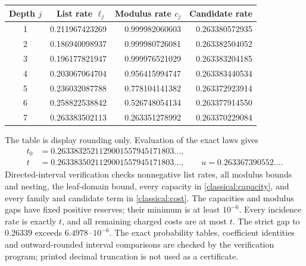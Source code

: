 \documentclass[10pt,a4paper]{article}
\theoremstyle{definition}
\begin{document}
\begin{center}\small
\begin{tabular}{@{}crrr@{}}\toprule
Depth $j$ & List rate $\ell_j$ & Modulus rate $c_j$ & Candidate rate\\\midrule
1 & 0.211967423269 & 0.999982060603 & 0.263380572935\\
2 & 0.186940098937 & 0.999980726081 & 0.263382504052\\
3 & 0.196177821947 & 0.999976521029 & 0.263383204185\\
4 & 0.203067064704 & 0.956415994747 & 0.263383440534\\
5 & 0.236032087788 & 0.778104141382 & 0.263372923914\\
6 & 0.258822538842 & 0.526748054134 & 0.263377914550\\
7 & 0.263383502113 & 0.263351278992 & 0.263370229084\\\bottomrule
\end{tabular}
\end{center}
The table is display rounding only. Evaluation of the exact laws gives
\begin{align*}
 t_0&=0.2633832521129001557945171803\ldots,\\
 t&=0.2633835021129001557945171803\ldots,\qquad
 u=0.263367390552\ldots .
\end{align*}
Directed-interval verification checks nonnegative list rates, all modulus
bounds and nesting, the leaf-domain bound, every capacity in
\eqref{classical:capacity}, and every family and candidate term in
\eqref{classical:cost}. The capacities and modulus gaps have fixed positive
reserves; their minimum is at least $10^{-6}$. Every incidence rate is
exactly $t$, and all remaining charged costs are at most $t$. The strict
gap to $0.26339$ exceeds $6.4978\cdot10^{-6}$. The exact probability tables,
coefficient identities and outward-rounded interval comparisons are
checked by the verification program; printed decimal truncation is not
used as a certificate.
\end{document}
